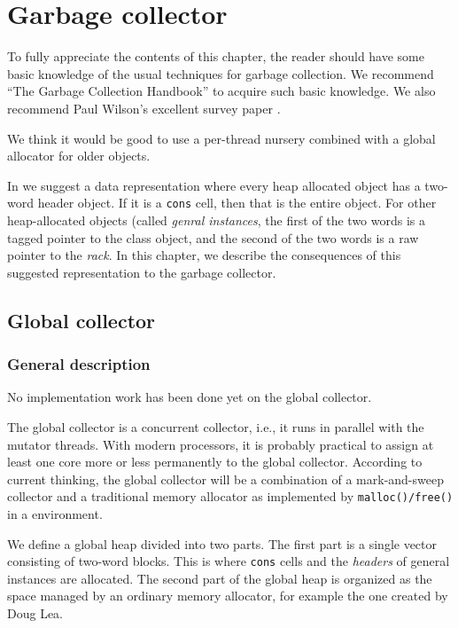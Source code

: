 \chapter{Garbage collector}

To fully appreciate the contents of this chapter, the reader should
have some basic knowledge of the usual techniques for garbage
collection.  We recommend ``The Garbage Collection Handbook''
\cite{Jones:2011:GCH:2025255} to acquire such basic knowledge.  We
also recommend Paul Wilson's excellent survey paper
\cite{Wilson:1992:UGC:645648.664824}.

We think it would be good to use a per-thread nursery combined with a
global allocator for older objects.

In  we suggest a data representation
where every heap allocated object has a two-word header object.  If it
is a \texttt{cons} cell, then that is the entire object.  For other
heap-allocated objects (called \emph{genral instances}, the first of
the two words is a tagged pointer to the class object, and the second
of the two words is a raw pointer to the \emph{rack}.  In
this chapter, we describe the consequences of this suggested
representation to the garbage collector.

\section{Global collector}
\subsection{General description}

No implementation work has been done yet on the global collector.

The global collector is a concurrent collector, i.e., it runs in
parallel with the mutator threads.  With modern processors, it is
probably practical to assign at least one core more or less
permanently to the global collector.  According to current thinking,
the global collector will be a combination of a mark-and-sweep
collector and a  traditional memory allocator as implemented by
\texttt{malloc()/free()} in a \clanguage{} environment.

We define a global heap divided into two parts.  The first part is a
single vector consisting of two-word blocks.  This is where
\texttt{cons} cells and the \emph{headers} of general instances are
allocated.  The second part of the global heap is organized as the
space managed by an ordinary memory allocator, for example the one
created by Doug Lea.

